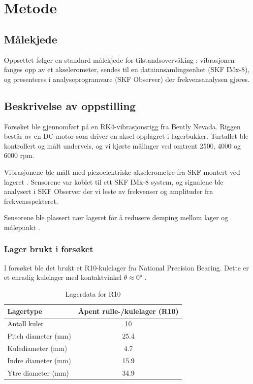 \section{Metode}

\subsection{Målekjede}
Oppsettet følger en standard målekjede for tilstandsovervåking \parencite{tbv2}: vibrasjonen fanges opp av et akselerometer, sendes til en datainnsamlingsenhet (SKF IMx-8), og presenteres i analyseprogramvare (SKF Observer) der frekvensanalysen gjøres.

\subsection{Beskrivelse av oppstilling}
Forsøket ble gjennomført på en RK4-vibrasjonsrigg fra Bently Nevada. Riggen består av en DC-motor som driver en aksel opplagret i lagerbukker. Turtallet ble kontrollert og målt underveis, og vi kjørte målinger ved omtrent 2500, 4000 og 6000 rpm.

Vibrasjonene ble målt med piezoelektriske akselerometre fra SKF montert ved lageret \parencite{vibrasjon1}. Sensorene var koblet til ett SKF IMx-8 system, og signalene ble analysert i SKF Observer der vi leste av frekvenser og amplituder fra frekvensspekteret.

Sensorene ble plassert nær lageret for å redusere demping mellom lager og målepunkt \parencite{vibrasjon3}.

\subsubsection*{Lager brukt i forsøket}
I forsøket ble det brukt et R10-kulelager fra National Precision Bearing. Dette er et enradig kulelager med kontaktvinkel $\theta \approx 0°$ \parencite{beregninglager}.
\begin{table}[h!]
\centering
\begin{tabular}{|l|c|}
\hline
\textbf{Lagertype} & \textbf{Åpent rulle-/kulelager (R10)} \\ \hline
Antall kuler & 10 \\ \hline
Pitch diameter (mm) & 25.4 \\ \hline
Kulediameter (mm) & 4.7 \\ \hline
Indre diameter (mm) & 15.9 \\ \hline
Ytre diameter (mm) & 34.9 \\ \hline
\end{tabular}
\caption{Lagerdata for R10}
\end{table}

